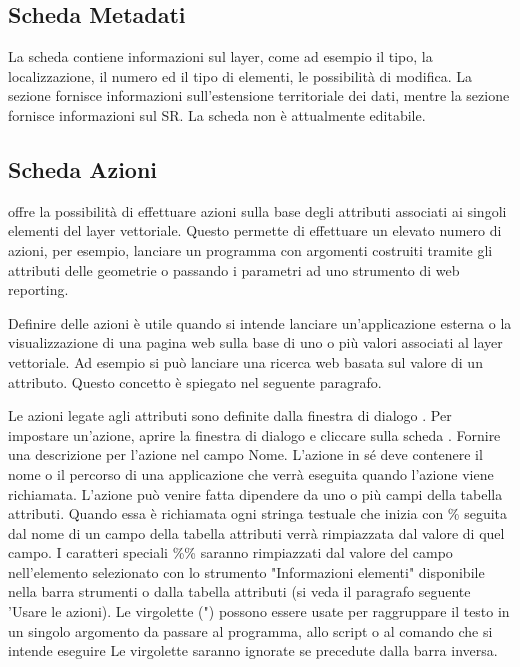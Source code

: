\subsection{Scheda Metadati}

La scheda  contiene informazioni sul layer, come ad esempio il tipo, 
la localizzazione, il numero ed il tipo di elementi, le possibilità di modifica. 
La sezione  fornisce informazioni sull'estensione territoriale 
dei dati, mentre la sezione  fornisce 
informazioni sul SR. La scheda  non è attualmente editabile.

\subsection{Scheda Azioni}\label{label_actions}

\qg offre la possibilità di effettuare azioni sulla base degli
attributi associati ai singoli elementi del layer vettoriale.
Questo permette di effettuare un elevato numero di azioni, per esempio,
lanciare un programma con argomenti costruiti tramite gli attributi
delle geometrie o passando i parametri ad uno strumento di web reporting.

Definire delle azioni è utile quando si intende lanciare un'applicazione
esterna o la visualizzazione di una pagina web sulla base di uno o più valori
associati al layer vettoriale. Ad esempio si può lanciare una ricerca web
basata sul valore di un attributo. Questo concetto è spiegato nel seguente
paragrafo.


Le azioni legate agli attributi sono definite dalla finestra di dialogo
. Per impostare un'azione, aprire la finestra
di dialogo  e cliccare sulla scheda . 
Fornire una descrizione per l'azione nel campo Nome. L'azione in
sé deve contenere il nome o il percorso di una applicazione che verrà eseguita quando
l'azione viene richiamata. L'azione può venire fatta dipendere da uno o più campi della tabella
attributi. Quando essa è richiamata ogni stringa testuale che inizia con \%
seguita dal nome di un campo della tabella attributi verrà rimpiazzata dal
valore di quel campo. I caratteri speciali \%\% saranno
rimpiazzati dal valore del campo nell'elemento selezionato con lo strumento
"Informazioni elementi" disponibile nella barra strumenti o dalla tabella attributi (si veda il paragrafo seguente 'Usare le azioni). 
Le virgolette (") possono essere usate per raggruppare il testo in un singolo argomento da
passare al programma, allo script o al comando che si intende eseguire Le
virgolette saranno ignorate se precedute dalla barra inversa.

